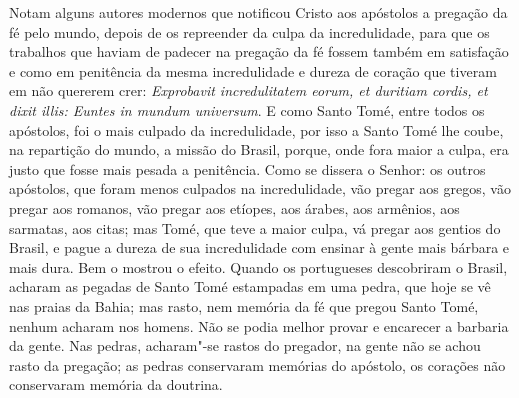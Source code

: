 Notam alguns autores modernos que notificou Cristo aos apóstolos a
pregação da fé pelo mundo, depois de os repreender da culpa da
incredulidade, para que os trabalhos que haviam de padecer na pregação
da fé fossem também em satisfação e como em penitência da mesma
incredulidade e dureza de coração que tiveram em não quererem crer:
\emph{Exprobavit incredulitatem eorum, et duritiam cordis, et dixit
illis: Euntes in mundum universum}. E como Santo Tomé, entre todos os
apóstolos, foi o mais culpado da incredulidade, por isso a Santo Tomé
lhe coube, na repartição do mundo, a missão do Brasil, porque, onde fora
maior a culpa, era justo que fosse mais pesada a penitência. Como se
dissera o Senhor: os outros apóstolos, que foram menos culpados na
incredulidade, vão
pregar aos gregos, vão pregar aos romanos, vão pregar aos etíopes, aos
árabes, aos armênios, aos sarmatas, aos citas; mas Tomé, que teve a
maior culpa, vá pregar aos gentios do Brasil, e pague a dureza de sua
incredulidade com ensinar à gente mais bárbara e mais dura. Bem o
mostrou o efeito. Quando os portugueses descobriram o Brasil, acharam as
pegadas de Santo Tomé estampadas em uma pedra, que hoje se vê nas praias
da Bahia; mas rasto, nem memória da fé que pregou Santo Tomé, nenhum
acharam nos homens. Não se podia melhor provar e encarecer a barbaria da
gente. Nas pedras, acharam"-se rastos do pregador, na gente não se achou
rasto da pregação; as pedras conservaram memórias do apóstolo, os
corações não conservaram memória da doutrina.

